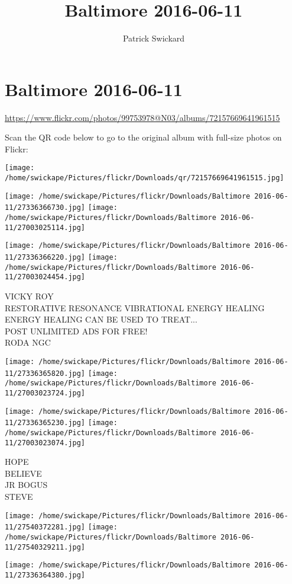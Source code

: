 \documentclass[10pt,letterpaper]{article}
\title{Baltimore 2016-06-11}
\author{Patrick Swickard}
\date{}
\begin{document}
\section*{Baltimore 2016-06-11}

\url{https://www.flickr.com/photos/99753978@N03/albums/72157669641961515}

Scan the QR code below to go to the original album with full-size photos on Flickr:

\texttt{[image: /home/swickape/Pictures/flickr/Downloads/qr/72157669641961515.jpg]}
\pagebreak

\texttt{[image: /home/swickape/Pictures/flickr/Downloads/Baltimore 2016-06-11/27336366730.jpg]}
\texttt{[image: /home/swickape/Pictures/flickr/Downloads/Baltimore 2016-06-11/27003025114.jpg]}

\texttt{[image: /home/swickape/Pictures/flickr/Downloads/Baltimore 2016-06-11/27336366220.jpg]}
\texttt{[image: /home/swickape/Pictures/flickr/Downloads/Baltimore 2016-06-11/27003024454.jpg]}

VICKY ROY\\
RESTORATIVE RESONANCE VIBRATIONAL ENERGY HEALING ENERGY HEALING CAN BE USED TO TREAT...\\
POST UNLIMITED ADS FOR FREE!\\
RODA NGC
\pagebreak

\texttt{[image: /home/swickape/Pictures/flickr/Downloads/Baltimore 2016-06-11/27336365820.jpg]}
\texttt{[image: /home/swickape/Pictures/flickr/Downloads/Baltimore 2016-06-11/27003023724.jpg]}

\texttt{[image: /home/swickape/Pictures/flickr/Downloads/Baltimore 2016-06-11/27336365230.jpg]}
\texttt{[image: /home/swickape/Pictures/flickr/Downloads/Baltimore 2016-06-11/27003023074.jpg]}

HOPE\\
BELIEVE\\
JR BOGUS\\
STEVE
\pagebreak

\texttt{[image: /home/swickape/Pictures/flickr/Downloads/Baltimore 2016-06-11/27540372281.jpg]}
\texttt{[image: /home/swickape/Pictures/flickr/Downloads/Baltimore 2016-06-11/27540329211.jpg]}

\texttt{[image: /home/swickape/Pictures/flickr/Downloads/Baltimore 2016-06-11/27336364380.jpg]}
\end{document}
